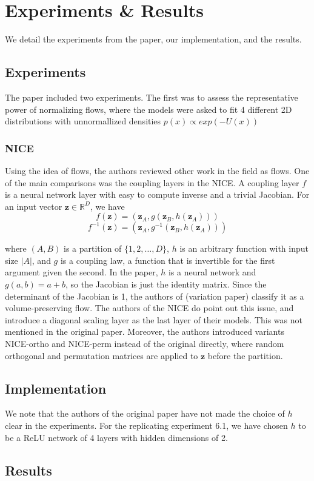 \chapter{Experiments \& Results}

We detail the experiments from the paper, our implementation, and the results.

\section{Experiments}

The paper included two experiments. The first was to assess the representative power of normalizing flows, where the models were asked to fit 4 different 2D distributions with unnormallized densities $p(x) \propto exp(-U(x))$

\subsection{NICE}

Using the idea of flows, the authors reviewed other work in the field as flows. One of the main comparisons was the coupling layers in the NICE. A coupling layer $f$ is a neural network layer with easy to compute inverse and a trivial Jacobian. For an input vector $\mathbf{z} \in \mathbb{R}^D$, we have
\begin{equation}
f(\mathbf{z}) = (\mathbf{z}_A, g(\mathbf{z}_B,h(\mathbf{z}_A))) 
\end{equation}
\begin{equation}
f^{-1}(\mathbf{z}) = (\mathbf{z}_A, g^{-1}(\mathbf{z}_B,h(\mathbf{z}_A)))
\end{equation}

where $(A,B)$ is a partition of $\{1,2,\dots,D\}$, $h$ is an arbitrary function with input size $|A|$, and $g$ is a coupling law, a function that is invertible for the first argument given the second. In the paper, $h$ is a neural network and $g(a,b)=a+b$, so the Jacobian is just the identity matrix. Since the determinant of the Jacobian is 1, the authors of (variation paper) classify it as a volume-preserving flow.
The authors of the NICE do point out this issue, and introduce a diagonal scaling layer as the last layer of their models. This was not mentioned in the original paper. Moreover, the authors introduced variants NICE-ortho and NICE-perm instead of the original directly, where random orthogonal and permutation matrices are applied to $\mathbf{z}$ before the partition. 



\section{Implementation}

We note that the authors of the original paper have not made the choice of $h$ clear in the experiments. For the replicating experiment 6.1, we have chosen $h$ to be a ReLU network of 4 layers with hidden dimensions of 2.

\section{Results}